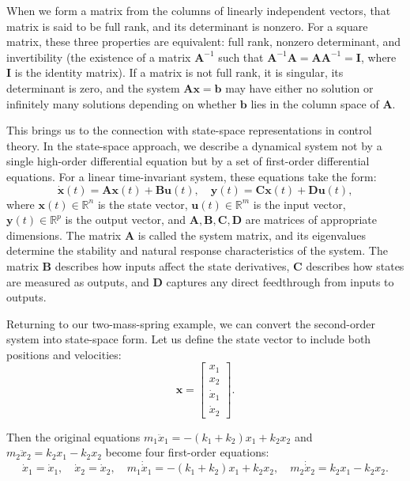 When we form a matrix from the columns of linearly independent vectors, that matrix is said to be full rank, and its determinant is nonzero. For a square matrix, these three properties are equivalent: full rank, nonzero determinant, and invertibility (the existence of a matrix $\mathbf{A}^{-1}$ such that $\mathbf{A}^{-1}\mathbf{A} = \mathbf{A}\mathbf{A}^{-1} = \mathbf{I}$, where $\mathbf{I}$ is the identity matrix). If a matrix is not full rank, it is singular, its determinant is zero, and the system $\mathbf{A}\mathbf{x} = \mathbf{b}$ may have either no solution or infinitely many solutions depending on whether $\mathbf{b}$ lies in the column space of $\mathbf{A}$.

This brings us to the connection with state-space representations in control theory. In the state-space approach, we describe a dynamical system not by a single high-order differential equation but by a set of first-order differential equations. For a linear time-invariant system, these equations take the form:
\[
\dot{\mathbf{x}}(t) = \mathbf{A}\mathbf{x}(t) + \mathbf{B}\mathbf{u}(t), \quad
\mathbf{y}(t) = \mathbf{C}\mathbf{x}(t) + \mathbf{D}\mathbf{u}(t),
\]
where $\mathbf{x}(t) \in \mathbb{R}^n$ is the state vector, $\mathbf{u}(t) \in \mathbb{R}^m$ is the input vector, $\mathbf{y}(t) \in \mathbb{R}^p$ is the output vector, and $\mathbf{A}, \mathbf{B}, \mathbf{C}, \mathbf{D}$ are matrices of appropriate dimensions. The matrix $\mathbf{A}$ is called the system matrix, and its eigenvalues determine the stability and natural response characteristics of the system. The matrix $\mathbf{B}$ describes how inputs affect the state derivatives, $\mathbf{C}$ describes how states are measured as outputs, and $\mathbf{D}$ captures any direct feedthrough from inputs to outputs.

Returning to our two-mass-spring example, we can convert the second-order system into state-space form. Let us define the state vector to include both positions and velocities:
\[
\mathbf{x} = \begin{bmatrix} x_1 \\ x_2 \\ \dot{x}_1 \\ \dot{x}_2 \end{bmatrix}.
\]

Then the original equations $m_1\ddot{x}_1 = -(k_1+k_2)x_1 + k_2 x_2$ and $m_2\ddot{x}_2 = k_2 x_1 - k_2 x_2$ become four first-order equations:
\[
\dot{x}_1 = \dot{x}_1, \quad
\dot{x}_2 = \dot{x}_2, \quad
m_1\dot{\dot{x}}_1 = -(k_1+k_2)x_1 + k_2 x_2, \quad
m_2\dot{\dot{x}}_2 = k_2 x_1 - k_2 x_2.
\]

